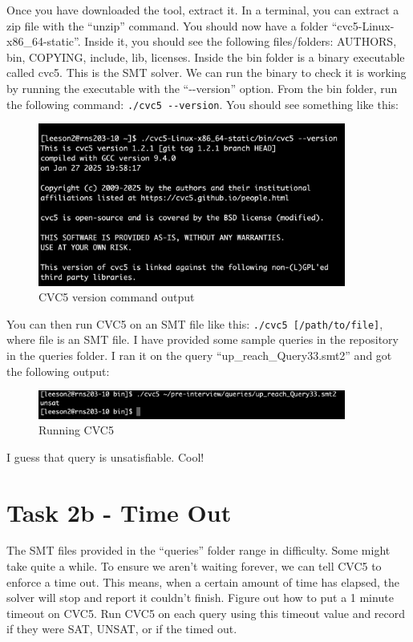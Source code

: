 \documentclass{article}
\begin{document}
Once you have downloaded the tool, extract it. In a terminal, you can extract a zip file with the ``unzip'' command. You should now have a folder ``cvc5-Linux-x86\_64-static''.
Inside it, you should see the following files/folders: AUTHORS, bin, COPYING, include, lib, licenses.
Inside the bin folder is a binary executable called cvc5.
This is the SMT solver.
We can run the binary to check it is working by running the executable with the ``-{}-version'' option.
From the bin folder, run the following command: \texttt{./cvc5 -{}-version}. You should see something like this:
\newpage
\begin{figure}[!t]
    \centering
    \includegraphics[width=0.9\textwidth ]{imgs/CVC-version.png}
    \caption{CVC5 version command output}\label{fig:CVC5-version}
\end{figure}

You can then run CVC5 on an SMT file like this: \texttt{./cvc5 [/path/to/file]}, where file is an SMT file. I have provided some sample queries in the repository in the queries folder. I ran it on the query ``up\_reach\_Query33.smt2'' and got the following output:

\begin{figure}[!h]
    \centering
    \includegraphics[width=0.9\textwidth ]{imgs/CVC-Running.png}
    \caption{Running CVC5}\label{fig:CVC5-running}
\end{figure}

\noindent
I guess that query is unsatisfiable. Cool!

\section*{Task 2b - Time Out}
The SMT files provided in the ``queries'' folder range in difficulty. Some might take quite a while.
To ensure we aren't waiting forever, we can tell CVC5 to enforce a time out.
This means, when a certain amount of time has elapsed, the solver will stop and report it couldn't finish.
Figure out how to put a 1 minute timeout on CVC5.
Run CVC5 on each query using this timeout value and record if they were SAT, UNSAT, or if the timed out.
\end{document}
